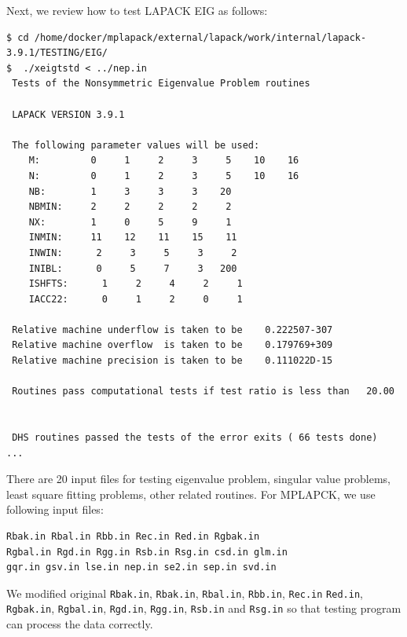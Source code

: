 \documentclass[12pt]{article}
\begin{document}
Next, we review how to test LAPACK EIG as follows:
\begin{verbatim}
$ cd /home/docker/mplapack/external/lapack/work/internal/lapack-3.9.1/TESTING/EIG/
$  ./xeigtstd < ../nep.in 
 Tests of the Nonsymmetric Eigenvalue Problem routines

 LAPACK VERSION 3.9.1

 The following parameter values will be used:
    M:         0     1     2     3     5    10    16
    N:         0     1     2     3     5    10    16
    NB:        1     3     3     3    20
    NBMIN:     2     2     2     2     2
    NX:        1     0     5     9     1
    INMIN:     11    12    11    15    11
    INWIN:      2     3     5     3     2
    INIBL:      0     5     7     3   200
    ISHFTS:      1     2     4     2     1
    IACC22:      0     1     2     0     1

 Relative machine underflow is taken to be    0.222507-307
 Relative machine overflow  is taken to be    0.179769+309
 Relative machine precision is taken to be    0.111022D-15

 Routines pass computational tests if test ratio is less than   20.00


 DHS routines passed the tests of the error exits ( 66 tests done)
...
\end{verbatim}
There are 20 input files for testing eigenvalue problem, singular value problems, least square fitting problems,
other related routines. For MPLAPCK, we use following input files:
\begin{verbatim}
Rbak.in Rbal.in Rbb.in Rec.in Red.in Rgbak.in
Rgbal.in Rgd.in Rgg.in Rsb.in Rsg.in csd.in glm.in 
gqr.in gsv.in lse.in nep.in se2.in sep.in svd.in
\end{verbatim}
We modified original {\tt Rbak.in}, {\tt Rbak.in}, {\tt Rbal.in}, {\tt Rbb.in}, {\tt Rec.in} 
{\tt Red.in}, {\tt Rgbak.in}, {\tt Rgbal.in}, {\tt Rgd.in}, {\tt Rgg.in}, {\tt Rsb.in} and {\tt Rsg.in}
so that testing program can process the data correctly.
\end{document}
